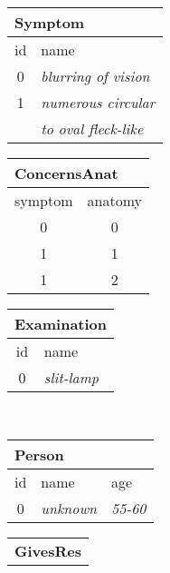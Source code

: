\begin{figure}[p]
\begin{minipage}[][\textheight][c]{\textwidth}
\begin{subfigure}{\linewidth}
\begin{adjustbox}{varwidth=\linewidth, max height=.2\textheight}
\begin{tabular}[t]{c|l}
                    \multicolumn{2}{l}{\textbf{Symptom}}             \\
                    \hline
                    \hline
                    id & name                                        \\
                    \hline
                    0  & \emph{blurring of vision}                   \\
                    1  & \emph{numerous circular} \\
                       & \emph{to oval fleck-like}
                \end{tabular}
                \quad
                \begin{tabular}[t]{c|c}
                    \multicolumn{2}{l}{\textbf{ConcernsAnat}} \\
                    \hline
                    \hline
                    symptom & anatomy                         \\
                    \hline
                    0       & 0                               \\
                    1       & 1                               \\
                    1       & 2
                \end{tabular}
                \quad
                \begin{tabular}[t]{c|l}
                    \multicolumn{2}{l}{\textbf{Examination}} \\
                    \hline
                    \hline
                    id & name                                \\
                    \hline
                    0  & \emph{slit-lamp}
                \end{tabular}\\
                \vspace{1em}
                \begin{tabular}[t]{c|l|l}
                    \multicolumn{2}{l}{\textbf{Person}} \\
                    \hline
                    \hline
                    id & name           & age           \\
                    \hline
                    0  & \emph{unknown} & \emph{55-60}  \\
                \end{tabular}
                \quad\hfill
                \begin{tabular}[t]{c|c}
                    \multicolumn{2}{l}{\textbf{GivesRes}} \\

\end{tabular}
\end{adjustbox}
\end{subfigure}
\end{minipage}
\end{figure}
